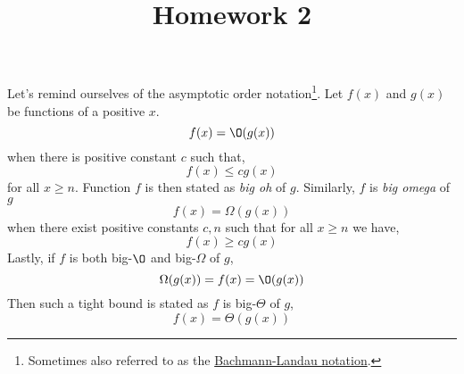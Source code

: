 \documentclass{homework}
\title{Homework 2}
\begin{document}
 \maketitle

Let's remind ourselves of the asymptotic order
notation\footnote{Sometimes also referred to as the
  \href{https://en.wikipedia.org/wiki/Big_O_notation}{Bachmann-Landau
    notation}.}. Let $f(x)$ and $g(x)$ be functions of a positive $x$.
\[
  f(x) = \O(g(x))
\]
when there is positive constant $c$ such that,
\[
  f(x) \leq cg(x)
\]
for all $x \geq n$. Function $f$ is then stated as \textit{big oh}
of $g$. Similarly, $f$ is \textit{big omega} of $g$ \ie
\[
  f(x) = \Omega(g(x))
\]
when there exist positive constants $c, n$ such that for all $x
  \geq n$ we have,
\[
  f(x) \geq cg(x)
\]
Lastly, if $f$ is both big-$\O$ and big-$\Omega$ of $g$,
\[
  \Omega(g(x)) = f(x) = \O(g(x))
\]
Then such a tight bound is stated as $f$ is big-$\Theta$ of $g$,
\[
  f(x) = \Theta(g(x))
\]
\end{document}
